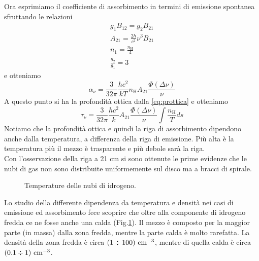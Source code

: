 Ora esprimiamo il coefficiente di assorbimento in termini di emissione spontanea sfruttando le relazioni
\begin{gather*}
    g_1B_{12}=g_2B_{21}\\
    A_{21}=\frac{2h}{c^2}\nu^3B_{21}\\
    n_1=\frac{n_\text{H}}{4}\\
    \frac{g_2}{g_1}=3
\end{gather*}
e otteniamo
\begin{equation}
    \alpha_\nu = \frac{3}{32\pi}\frac{hc^2}{kT}n_\text{H}A_{21}\frac{\Phi(\Delta\nu)}{\nu}
\end{equation}
A questo punto si ha la profondità ottica dalla \ref{eq:prottica} e otteniamo
\begin{equation}
    \tau_\nu = \frac{3}{32\pi}\frac{hc^2}{k}A_{21}\frac{\Phi(\Delta\nu)}{\nu}\int\frac{n_\text{H}}{T}ds
\end{equation}
Notiamo che la profondità ottica e quindi la riga di assorbimento dipendono anche dalla temperatura, a differenza della riga di emissione. Più alta è la temperatura più il mezzo è trasparente e più debole sarà la riga. \\
Con l'osservazione della riga a 21 cm si sono ottenute le prime evidenze che le nubi di gas non sono distribuite uniformemente sul disco ma a bracci di spirale.\\
\begin{figure}[t!]
    \centering
    \caption{Temperature delle nubi di idrogeno.}
    \label{fig:nubitemp}
\end{figure}
Lo studio della differente dipendenza da temperatura e densità nei casi di emissione ed assorbimento fece scoprire che oltre alla componente di idrogeno fredda ce ne fosse anche una calda (Fig.\ref{fig:nubitemp}). Il mezzo è composto per la maggior parte (in massa) dalla zona fredda, mentre la parte calda è molto rarefatta. La densità della zona fredda è circa $(1\div100)\text{ cm}^{-3}$, mentre di quella calda è circa $(0.1\div1)\text{ cm}^{-3}$.\\
